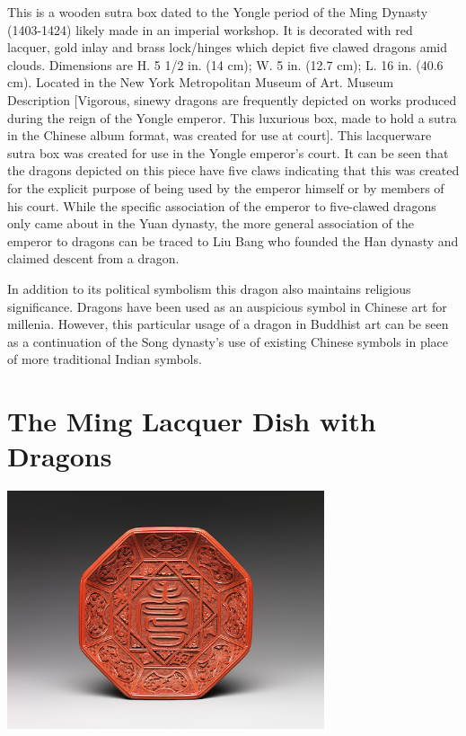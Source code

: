 \documentclass[
]{book}
\begin{document}
This is a wooden sutra box dated to the Yongle period of the Ming Dynasty (1403-1424) likely made in an imperial workshop. It is decorated with red lacquer, gold inlay and brass lock/hinges which depict five clawed dragons amid clouds. Dimensions are H. 5 1/2 in. (14 cm); W. 5 in. (12.7 cm); L. 16 in. (40.6 cm). Located in the New York Metropolitan Museum of Art. Museum Description {[}Vigorous, sinewy dragons are frequently depicted on works produced during the reign of the Yongle emperor. This luxurious box, made to hold a sutra in the Chinese album format, was created for use at court{]}.
This lacquerware sutra box was created for use in the Yongle emperor's court. It can be seen that the dragons depicted on this piece have five claws indicating that this was created for the explicit purpose of being used by the emperor himself or by members of his court. While the specific association of the emperor to five-clawed dragons only came about in the Yuan dynasty, the more general association of the emperor to dragons can be traced to Liu Bang who founded the Han dynasty and claimed descent from a dragon.

In addition to its political symbolism this dragon also maintains religious significance. Dragons have been used as an auspicious symbol in Chinese art for millenia. However, this particular usage of a dragon in Buddhist art can be seen as a continuation of the Song dynasty's use of existing Chinese symbols in place of more traditional Indian symbols.

\hypertarget{the-ming-lacquer-dish-with-dragons}{%
\section*{The Ming Lacquer Dish with Dragons}\label{the-ming-lacquer-dish-with-dragons}}

\includegraphics[width=0.7\textwidth,height=\textheight]{images/Ming_Lacquer_Dish_with_Dragons.png}
\end{document}
